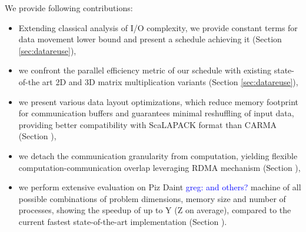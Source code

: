 \documentclass[sigconf]{acmart}
\newcommand\greg[1]{\textcolor{blue}{greg: #1}}
\begin{document}
	We provide following contributions:
	\begin{itemize}
		\item Extending classical analysis of I/O complexity, we provide 
		constant terms for data movement lower bound and present a schedule 
		achieving it (Section \ref{sec:datareuse}),
		\item we confront the parallel efficiency metric of our schedule with 
		existing state-of-the art 2D and 3D matrix multiplication variants 
		(Section \ref{sec:datareuse}),
		\item we present various data layout optimizations, which reduce memory 
		footprint for communication buffers and guarantees minimal reshuffling 
		of input data, providing better compatibility with ScaLAPACK format 
		than CARMA (Section \label{sec:implementation}),
		\item we detach the communication granularity from computation, 
		yielding flexible computation-communication overlap leveraging RDMA 
		mechanism (Section \label{sec:implementation}),
		\item we perform extensive evaluation on Piz Daint \greg{and others?} 
		machine of all possible combinations of problem dimensions, memory size 
		and number of processes, showing the speedup of up to Y (Z on average), 
		compared to the current fastest state-of-the-art implementation 
		(Section \label{sec:evaluation}).
	\end{itemize}
%	
\end{document}
